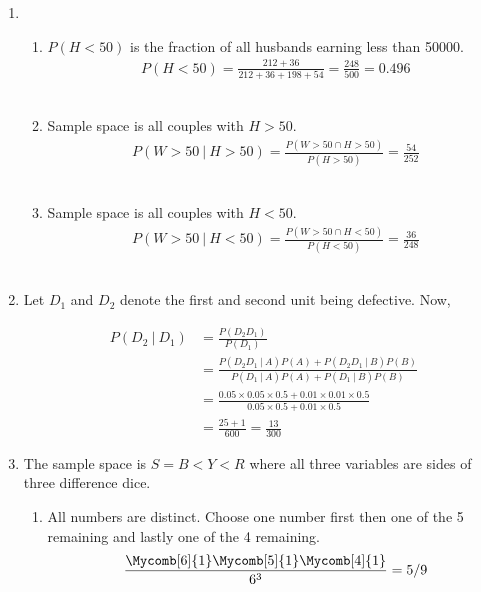 \begin{enumerate}
	
	\item \begin{enumerate}
		
			\item $ P(H < 50) $ is the fraction of all husbands earning less than 50000.
			\begin{align}
				P(H < 50) = \frac{212+36}{212+36+198+54} = \frac{248}{500} = 0.496
			\end{align}\\
			
			\item Sample space is all couples with $ H > 50 $.
			\begin{align}
				P(W > 50\ |\ H > 50) = \frac{P(W > 50 \cap H > 50)}{P(H > 50)} = \frac{54}{252}
			\end{align}\\
			
			\item Sample space is all couples with $ H < 50 $.
			\begin{align}
				P(W > 50\ |\ H < 50) = \frac{P(W > 50 \cap H < 50)}{P(H < 50)} = \frac{36}{248}
			\end{align}\\
		
	\end{enumerate} 
	
	\item Let $ D_1 $ and $ D_2 $ denote the first and second unit being defective. Now, 
	
	
		
		\begin{align}			
			P(D_2\ |\ D_1) &= \frac{P(D_2 D_1)}{P(D_1)} \\
			&= \frac{P(D_2 D_1\ |\ A)P(A) + P(D_2 D_1\ |\ B)P(B)}{P(D_1\ |\ A)P(A) + P(D_1\ |\ B)P(B)} \\
			&= \frac{0.05 \times 0.05 \times 0.5 + 0.01 \times 0.01 \times 0.5}{0.05 \times 0.5 + 0.01 \times 0.5} \\
			&= \frac{25 + 1}{600} = \frac{13}{300}
		\end{align}
		
	
	
	\item The sample space is $ S = {B<Y<R} $ where all three variables are sides of three difference dice.\\
	
		\begin{enumerate}
			
			\item All numbers are distinct. Choose one number first then one of the 5 remaining and lastly one of the 4 remaining.\\
			\begin{align}
				\frac{\Mycomb[6]{1} \Mycomb[5]{1} \Mycomb[4]{1}}{6^3} = 5/9
			\end{align}\\
			

\end{enumerate}
\end{enumerate}
